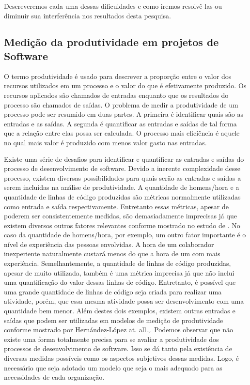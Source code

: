 Descreveremos cada uma dessas dificuldades e como iremos resolvê-las ou diminuir sua interferência nos resultados desta pesquisa.
 
 
 \subsection{Medição da produtividade em projetos de Software}
 
 O termo produtividade é usado para descrever a proporção entre o valor dos recursos utilizados em um processo e o valor do que é efetivamente produzido. Os recursos aplicados são chamados de entradas enquanto que os resultados do processo são chamados de saídas. O problema de medir a produtividade de um processo pode ser resumido em duas partes. A primeira é identificar quais são as entradas e as saídas. A segunda é quantificar  as entradas e saídas de tal forma que a relação entre elas possa ser calculada. O processo mais eficiência é aquele no qual mais valor é produzido com menos valor gasto nas entradas.

Existe uma série de desafios para identificar e quantificar as entradas e saídas do processo de desenvolvimento de software. Devido a inerente complexidade desse processo, existem diversas possibilidades para quais serão as entradas e saídas a serem incluídas na análise de produtividade. A quantidade de homens/hora e a quantidade de linhas de código produzidas são métricas normalmente utilizadas como entrada e saída respectivamente.  Entretanto essas métricas, apesar de poderem ser consistentemente medidas, são demasiadamente imprecisas já que existem diversos outros fatores relevantes conforme mostrado no estudo de \cite{maccormack2003trade}. No caso da quantidade de homens/hora, por exemplo, um outro fator importante é o nível de experiência das pessoas envolvidas. A hora de um colaborador inexperiente naturalmente custará menos do que a hora de um com mais experiência. Semelhantemente, a quantidade de linhas de código produzidas, apesar de muito utilizada, também é uma métrica imprecisa já que não inclui uma quantificação do valor dessas linhas de código. Entretanto,  é possível que uma grande quantidade de linhas de código seja criada para realizar uma atividade, porém, que essa mesma atividade possa ser desenvolvimento com uma quantidade bem menor. Além destes dois exemplos, existem outras entradas e saídas que podem ser utilizadas em modelos de medição de produtividade conforme mostrado por Hernández-López at. all.,\cite{hernandez2015productivity}. Podemos observar que não existe uma forma totalmente precisa para se avaliar a produtividade dos processos de desenvolvimento de software. Isso se dá tanto pela existência de diversas medidas possíveis como os aspectos subjetivos dessas medidas. Logo, é necessário que seja adotado um modelo que seja o mais adequado para as necessidades de cada organização.

